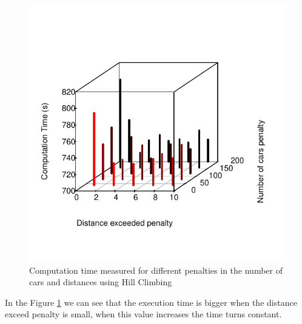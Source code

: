 \documentclass[12]{article}
\begin{document}
\begin{figure}[H]
  \captionsetup{justification=centering}
   \centering 
    \includegraphics[scale=0.8]{Results/data_5_1.pdf}
      \caption{Computation time measured for different penalties in the number of cars and distances using Hill Climbing}
      \label{fig:data_5_1}
  \end{figure}
    \vspace{1cm}

In the Figure \ref{fig:data_5_1} we can see that the execution time is bigger when the distance exceed penalty is small, when this value increases the time turns constant.
\end{document}

